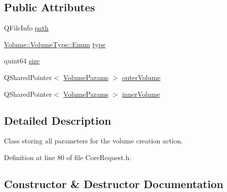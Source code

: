 \subsection*{Public Attributes}
\begin{DoxyCompactItemize}
\item 
Q\+File\+Info \hyperlink{struct_gost_crypt_1_1_core_1_1_create_volume_request_a1760fb8fc07a2d908b8e5d5aff4b2804}{path}
\item 
\hyperlink{struct_gost_crypt_1_1_volume_1_1_volume_type_a7fe1979dab76d4534dcb1e26179d4717}{Volume\+::\+Volume\+Type\+::\+Enum} \hyperlink{struct_gost_crypt_1_1_core_1_1_create_volume_request_aa4c497393df84a5adc5c24dbefd1562b}{type}
\item 
quint64 \hyperlink{struct_gost_crypt_1_1_core_1_1_create_volume_request_a3c8d5e758b3118859b41b9f2238fdd9e}{size}
\item 
Q\+Shared\+Pointer$<$ \hyperlink{struct_gost_crypt_1_1_core_1_1_create_volume_request_1_1_volume_params}{Volume\+Params} $>$ \hyperlink{struct_gost_crypt_1_1_core_1_1_create_volume_request_a7f07dffa570aa30985f32f42a7d4bd11}{outer\+Volume}
\item 
Q\+Shared\+Pointer$<$ \hyperlink{struct_gost_crypt_1_1_core_1_1_create_volume_request_1_1_volume_params}{Volume\+Params} $>$ \hyperlink{struct_gost_crypt_1_1_core_1_1_create_volume_request_a98f883d567a2e3e0ae1418643a68f5e2}{inner\+Volume}
\end{DoxyCompactItemize}


\subsection{Detailed Description}
Class storing all parameters for the volume creation action. 

Definition at line 80 of file Core\+Request.\+h.



\subsection{Constructor \& Destructor Documentation}
\mbox{\label{struct_gost_crypt_1_1_core_1_1_create_volume_request_ad825b9509e91345874223eed5f086b17}} 
